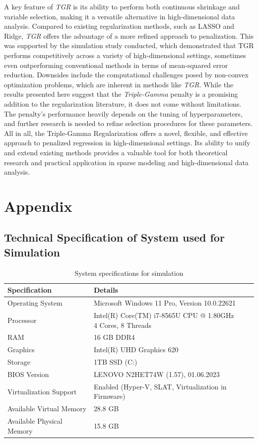 \documentclass[12pt,a4paper]{article}
\begin{document}
A key feature of \textit{TGR} is its ability to perform both continuous shrinkage and variable selection, making it a versatile alternative in high-dimensional data analysis. Compared to existing regularization methods, such as LASSO and Ridge, \textit{TGR} offers the advantage of a more refined approach to penalization. This was supported by the simulation study conducted, which demonstrated that TGR performs competitively across a variety of high-dimensional settings, sometimes even outperforming conventional methods in terms of mean-squared error reduction. Downsides include the computational challenges posed by non-convex optimization problems, which are inherent in methods like \textit{TGR}. While the results presented here suggest that the \textit{Triple-Gamma} penalty is a promising addition to the regularization literature, it does not come without limitations. The penalty’s performance heavily depends on the tuning of hyperparameters, and further research is needed to refine selection procedures for these parameters.\\

All in all, the Triple-Gamma Regularization offers a novel, flexible, and effective approach to penalized regression in high-dimensional settings. Its ability to unify and extend existing methods provides a valuable tool for both theoretical research and practical application in sparse modeling and high-dimensional data analysis. 


\section{Appendix}
\subsection{Technical Specification of System used for Simulation}

\begin{table}[H]
\centering
\begin{tabular}{ll}
\toprule
\textbf{Specification} & \textbf{Details} \\
\midrule
Operating System       & Microsoft Windows 11 Pro, Version 10.0.22621 \\
Processor              & \makecell[l]{Intel(R) Core(TM) i7-8565U CPU @ 1.80GHz\\4 Cores, 8 Threads} \\
RAM                    & 16 GB DDR4 \\
Graphics               & Intel(R) UHD Graphics 620 \\
Storage                & 1TB SSD (C:) \\
BIOS Version           & LENOVO N2HET74W (1.57), 01.06.2023 \\
Virtualization Support & Enabled (Hyper-V, SLAT, Virtualization in Firmware) \\
Available Virtual Memory & 28.8 GB \\
Available Physical Memory & 15.8 GB \\
\bottomrule
\end{tabular}
\caption{System specifications for simulation}
\end{table}


\newpage
\listoffigures

\newpage
\listoftables
\newpage

\newpage
\pagestyle{plain}
%
%
\printbibliography[]
\clearpage
\end{document}
